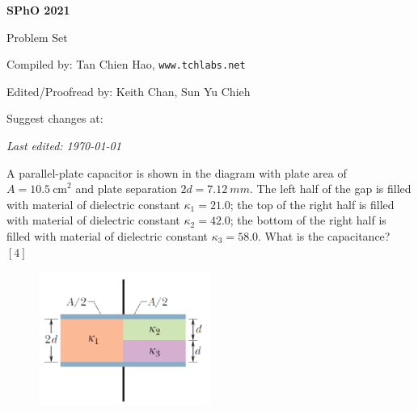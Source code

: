 \def\sphoyear{2021}
\setcounter{section}{0}
\fancyhead[L]{\textbf{SPhO \sphoyear}} 


\begin{titlepage}
\centering

{\Huge\bfseries SPhO \sphoyear}

\vspace{1cm}

{\LARGE Problem Set}

\vspace{2cm}

{\Large Compiled by: Tan Chien Hao, \texttt{www.tchlabs.net}}

\vspace{2cm}

{\Large Edited/Proofread by: Keith Chan, Sun Yu Chieh}

\vspace{2cm}

{\large Suggest changes at: \github}


\vfill

{\itshape Last edited: \today}
\end{titlepage}

\begin{problem}
    A parallel-plate capacitor is shown in the diagram with plate area of $A = \qty{10.5}{\cm}^2$ and plate separation $2d = \qty{7.12}{mm}$. The left half of the gap is filled with material of dielectric constant $\kappa_1 = 21.0$; the top of the right half is filled with material of dielectric constant $\kappa_2 = 42.0$; the bottom of the right half is filled with material of dielectric constant $\kappa_3 = 58.0$. What is the capacitance? \hfill $[4]$
    \begin{figure}[H]
        \centering
        \includegraphics[width=0.5\textwidth]{spho_book_TYS_images/2021SPhO_1.png}
        \label{fig:1}
    \end{figure}
\end{problem}

